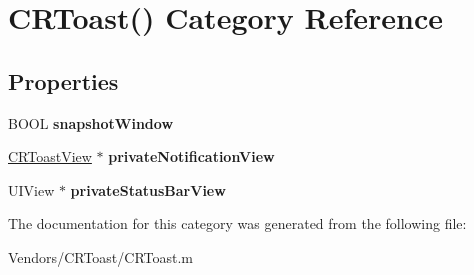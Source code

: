 \hypertarget{category_c_r_toast_07_08}{}\section{C\+R\+Toast() Category Reference}
\label{category_c_r_toast_07_08}
\subsection*{Properties}
\begin{DoxyCompactItemize}
\item 
\hypertarget{category_c_r_toast_07_08_ae0024db1300e92770e74148106677944}{}B\+O\+O\+L {\bfseries snapshot\+Window}\label{category_c_r_toast_07_08_ae0024db1300e92770e74148106677944}

\item 
\hypertarget{category_c_r_toast_07_08_a164b6bfe4fdd88bc124f2c3f0e52ee5e}{}\hyperlink{interface_c_r_toast_view}{C\+R\+Toast\+View} $\ast$ {\bfseries private\+Notification\+View}\label{category_c_r_toast_07_08_a164b6bfe4fdd88bc124f2c3f0e52ee5e}

\item 
\hypertarget{category_c_r_toast_07_08_abf6d0f7e457da8785034e164229b17b7}{}U\+I\+View $\ast$ {\bfseries private\+Status\+Bar\+View}\label{category_c_r_toast_07_08_abf6d0f7e457da8785034e164229b17b7}

\end{DoxyCompactItemize}


The documentation for this category was generated from the following file\+:\begin{DoxyCompactItemize}
\item 
Vendors/\+C\+R\+Toast/C\+R\+Toast.\+m\end{DoxyCompactItemize}
